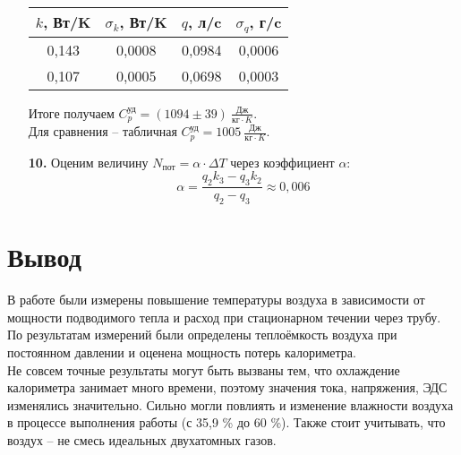 \documentclass[a4paper,12pt]{article}
\begin{document}
\begin{enumerate}
            \begin{center}
		\begin{tabular}{|c|c|c|c|}
			\hline
			$k$, Вт/K & $\sigma_k$, Вт/K & $q$, л/c & $\sigma_q$, г/c \\ \hline
			0,143 & 0,0008 & 0,0984 & 0,0006 \\ \hline
			0,107 & 0,0005 & 0,0698 & 0,0003 \\ \hline
		\end{tabular}
            \end{center}

            Итоге получаем $C_p^{\text{уд}} = (1094 \pm 39)\ \frac{Дж}{кг \cdot K}$.
            \\Для сравнения -- табличная $C_p^{\text{уд}} = 1005\ \frac{\text{Дж}}{кг \cdot K}$.
	
		\item [\textbf{10.}] Оценим величину $N_{\text{пот}} = \alpha \cdot \Delta T$ через коэффициент $\alpha$: 
		$$ \alpha = \frac{q_2 k_3 - q_3 k_2}{q_2 - q_3} \approx 0,006$$
	\end{enumerate}

        \section{Вывод}
        
            В работе были измерены повышение температуры воздуха в зависимости от мощности подводимого тепла и расход при стационарном течении через трубу. По
        результатам измерений были определены теплоёмкость воздуха при постоянном давлении и оценена мощность потерь калориметра.\\
        Не совсем точные результаты могут быть вызваны тем, что охлаждение калориметра занимает много времени, поэтому значения тока, напряжения, ЭДС изменялись значительно. Сильно могли повлиять и изменение влажности воздуха в процессе выполнения работы (с 35,9 \% до 60 \%). Также стоит учитывать, что воздух -- не смесь идеальных двухатомных газов.
\end{document}
